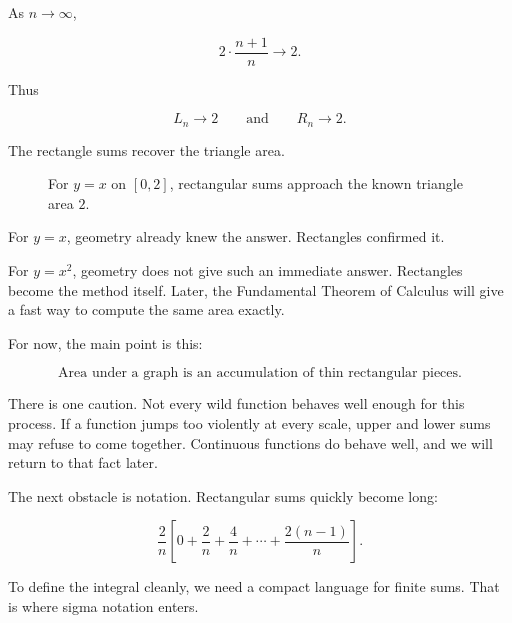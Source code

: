 As \(n\to\infty\),

\[
2\cdot\frac{n+1}{n}\to2.
\]

Thus

\[
L_n\to2
\qquad\text{and}\qquad
R_n\to2.
\]

The rectangle sums recover the triangle area.

\begin{figure}[h]
\centering
{}
\caption{For \(y=x\) on \([0,2]\), rectangular sums approach the known triangle area \(2\).}
\label{fig:rectangles-triangle-area}
\end{figure}

For \(y=x\), geometry already knew the answer.  Rectangles confirmed it.

For \(y=x^2\), geometry does not give such an immediate answer.  Rectangles become
the method itself.  Later, the Fundamental Theorem of Calculus will give a fast way
to compute the same area exactly.

For now, the main point is this:

\[
\boxed{
\text{Area under a graph is an accumulation of thin rectangular pieces.}
}
\]

There is one caution.  Not every wild function behaves well enough for this process.
If a function jumps too violently at every scale, upper and lower sums may refuse to
come together.  Continuous functions do behave well, and we will return to that fact
later.

The next obstacle is notation.  Rectangular sums quickly become long:

\[
\frac{2}{n}
\left[
0+\frac{2}{n}+\frac{4}{n}+\cdots+\frac{2(n-1)}{n}
\right].
\]

To define the integral cleanly, we need a compact language for finite sums.  That is
where sigma notation enters.

